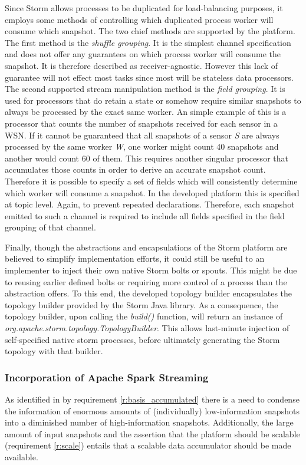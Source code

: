 

Since Storm allows processes to be duplicated for load-balancing purposes, it employs some methods of controlling which duplicated process worker will consume which snapshot. The two chief methods are supported by the platform. The first method is the \emph{shuffle grouping}. It is the simplest channel specification and does not offer any guarantees on which process worker will consume the snapshot. It is therefore described as receiver-agnostic. However this lack of guarantee will not effect most tasks since most will be stateless data processors. The second supported stream manipulation method is the \emph{field grouping}. It is used for processors that do retain a state or somehow require similar snapshots to always be processed by the exact same worker. An simple example of this is a processor that counts the number of snapshots received for each sensor in a WSN. If it cannot be guaranteed that all snapshots of a sensor \emph{S} are always processed by the same worker \emph{W}, one worker might count 40 snapshots and another would count 60 of them. This requires another singular processor that accumulates those counts in order to derive an accurate snapshot count. Therefore it is possible to specify a set of fields which will consistently determine which worker will consume a snapshot. In the developed platform this is specified at topic level. Again, to prevent repeated declarations. Therefore, each snapshot emitted to such a channel is required to include all fields specified in the field grouping of that channel.

Finally, though the abstractions and encapsulations of the Storm platform are believed to simplify implementation efforts, it could still be useful to an implementer to inject their own native Storm bolts or spouts. This might be due to reusing earlier defined bolts or requiring more control of a process than the abstraction offers. To this end, the developed topology builder encapsulates the topology builder provided by the Storm Java library. As a consequence, the topology builder, upon calling the \emph{build()} function, will return an instance of \emph{org.apache.storm.topology.TopologyBuilder}. This allows last-minute injection of self-specified native storm processes, before ultimately generating the Storm topology with that builder.

\subsubsection*{Incorporation of Apache Spark Streaming}
\label{sec:incorporation_spark}
As identified in by requirement \ref{r:basis_accumulated} there is a need to condense the information of enormous amounts of (individually) low-information snapshots into a diminished number of high-information snapshots. Additionally, the large amount of input snapshots and the assertion that the platform should be scalable (requirement \ref{r:scale}) entails that a scalable data accumulator should be made available. 

